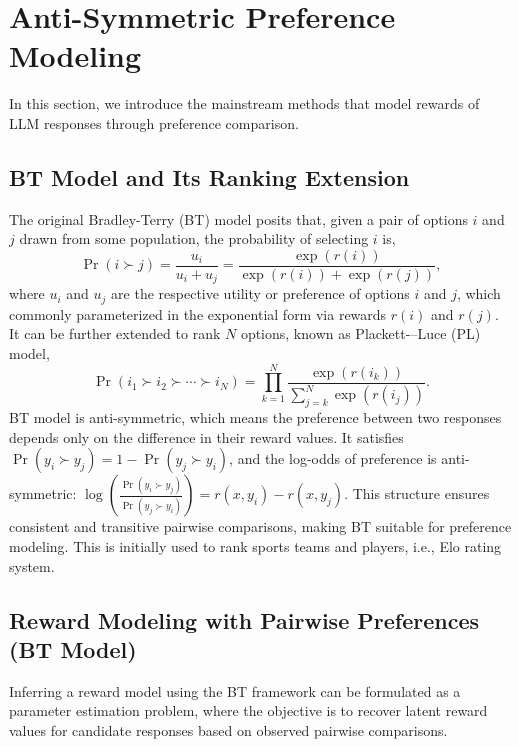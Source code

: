 \section{Anti-Symmetric Preference Modeling}

In this section, we introduce the mainstream methods that model rewards of LLM responses through preference comparison.

\subsection{BT Model and Its Ranking Extension}

The original Bradley-Terry (BT) model posits that, given a pair of options $i$ and $j$ drawn from some population, the probability of selecting $i$ is,
\begin{equation}
	\Pr(i \succ j) = \frac{u_i}{u_i + u_j}=\frac{\exp(r(i))}{\exp(r(i)) + \exp(r(j))}, \label{eq:bt}
\end{equation}
where $u_i$ and $u_j$ are the respective utility or preference of options $i$ and $j$, which commonly parameterized in the exponential form via rewards $r(i)$ and $r(j)$. It can be further extended to rank $N$ options, known as Plackett-–Luce (PL) model,
\begin{equation}
	\Pr(i_1 \succ i_2 \succ \cdots \succ i_N) = \prod_{k=1}^{N} \frac{\exp(r(i_k))}{\sum_{j=k}^{N} \exp(r(i_j))}. \label{eq:pl}
\end{equation}
BT model is anti-symmetric, which means the preference between two responses depends only on the difference in their reward values. It satisfies $\Pr(y_i \succ y_j) = 1 - \Pr(y_j \succ y_i)$, and the log-odds of preference is anti-symmetric: $\log \left( \frac{\Pr(y_i \succ y_j)}{\Pr(y_j \succ y_i)} \right) = r(x, y_i) - r(x, y_j)$. This structure ensures consistent and transitive pairwise comparisons, making BT suitable for preference modeling. This is initially used to rank sports teams and players, i.e., Elo rating system.

\subsection{Reward Modeling with Pairwise Preferences (BT Model)}

Inferring a reward model using the BT framework can be formulated as a parameter estimation problem, where the objective is to recover latent reward values for candidate responses based on observed pairwise comparisons.

